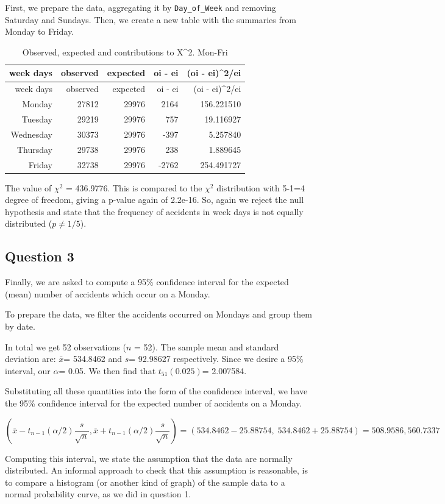 \documentclass[]{article}
\begin{document}
First, we prepare the data, aggregating it by \texttt{Day\_of\_Week} and
removing Saturday and Sundays. Then, we create a new table with the
summaries from Monday to Friday.

\begin{longtable}[]{@{}rrrrr@{}}
\caption{Observed, expected and contributions to X\^{}2.
Mon-Fri}\tabularnewline
\toprule
week days & observed & expected & oi - ei & (oi -
ei)\^{}2/ei\tabularnewline
\midrule
\endfirsthead
\toprule
week days & observed & expected & oi - ei & (oi -
ei)\^{}2/ei\tabularnewline
\midrule
\endhead
Monday & 27812 & 29976 & 2164 & 156.221510\tabularnewline
Tuesday & 29219 & 29976 & 757 & 19.116927\tabularnewline
Wednesday & 30373 & 29976 & -397 & 5.257840\tabularnewline
Thursday & 29738 & 29976 & 238 & 1.889645\tabularnewline
Friday & 32738 & 29976 & -2762 & 254.491727\tabularnewline
\bottomrule
\end{longtable}

The value of \(\chi ^2\) = 436.9776. This is compared to the \(\chi ^2\)
distribution with 5-1=4 degree of freedom, giving a p-value again of
2.2e-16. So, again we reject the null hypothesis and state that the
frequency of accidents in week days is not equally distributed
(\(p\neq1/5\)).

\subsection{Question 3}\label{question-3}

Finally, we are asked to compute a 95\% confidence interval for the
expected (mean) number of accidents which occur on a Monday.

To prepare the data, we filter the accidents occurred on Mondays and
group them by date.

In total we get 52 observations (\(n\) = 52). The sample mean and
standard deviation are: \(\bar{x}\)= 534.8462 and \(s\)= 92.98627
respectively. Since we desire a 95\% interval, our \(\alpha\)= 0.05. We
then find that \(t_{51}(0.025)\)= 2.007584.

Substituting all these quantities into the form of the confidence
interval, we have the 95\% confidence interval for the expected number
of accidents on a Monday.

\[\left ( \bar{x} -t_{n-1}(\alpha /2)\frac{s}{\sqrt{n}}, \bar{x} +t_{n-1}(\alpha /2)\frac{s}{\sqrt{n}}\right) = (534.8462-25.88754,\; 534.8462+25.88754) = 508.9586, 560.7337\]

Computing this interval, we state the assumption that the data are
normally distributed. An informal approach to check that this assumption
is reasonable, is to compare a histogram (or another kind of graph) of
the sample data to a normal probability curve, as we did in question 1.
\end{document}

